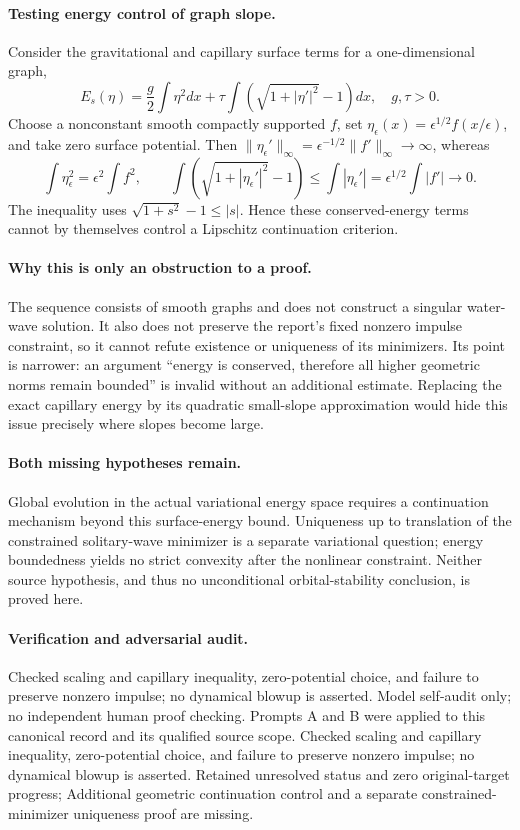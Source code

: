 \documentclass[11pt]{article}
\begin{document}
\paragraph{Testing energy control of graph slope.} Consider the gravitational and capillary surface terms for a one-dimensional graph,
\[
 E_s(\eta)=\frac g2\int\eta^2dx+\tau\int(\sqrt{1+|\eta'|^2}-1)dx,
 \quad g,\tau>0.
\]
Choose a nonconstant smooth compactly supported $f$, set $\eta_\epsilon(x)=\epsilon^{1/2}f(x/\epsilon)$, and take zero surface potential. Then $\|\eta_\epsilon'\|_\infty=\epsilon^{-1/2}\|f'\|_\infty\to\infty$, whereas
\[
 \int\eta_\epsilon^2=\epsilon^2\int f^2,\qquad
 \int(\sqrt{1+|\eta_\epsilon'|^2}-1)
 \leq\int|\eta_\epsilon'|=\epsilon^{1/2}\int|f'|\to0.
\]
The inequality uses $\sqrt{1+s^2}-1\leq|s|$. Hence these conserved-energy terms cannot by themselves control a Lipschitz continuation criterion.

\paragraph{Why this is only an obstruction to a proof.} The sequence consists of smooth graphs and does not construct a singular water-wave solution. It also does not preserve the report's fixed nonzero impulse constraint, so it cannot refute existence or uniqueness of its minimizers. Its point is narrower: an argument ``energy is conserved, therefore all higher geometric norms remain bounded'' is invalid without an additional estimate. Replacing the exact capillary energy by its quadratic small-slope approximation would hide this issue precisely where slopes become large.

\paragraph{Both missing hypotheses remain.} Global evolution in the actual variational energy space requires a continuation mechanism beyond this surface-energy bound. Uniqueness up to translation of the constrained solitary-wave minimizer is a separate variational question; energy boundedness yields no strict convexity after the nonlinear constraint. Neither source hypothesis, and thus no unconditional orbital-stability conclusion, is proved here.

\paragraph{Verification and adversarial audit.}
Checked scaling and capillary inequality, zero-potential choice, and failure to preserve nonzero impulse; no dynamical blowup is asserted. Model self-audit only; no independent human proof checking. Prompts A and B were applied to this canonical record and its qualified source scope. Checked scaling and capillary inequality, zero-potential choice, and failure to preserve nonzero impulse; no dynamical blowup is asserted. Retained unresolved status and zero original-target progress; Additional geometric continuation control and a separate constrained-minimizer uniqueness proof are missing.
\end{document}

